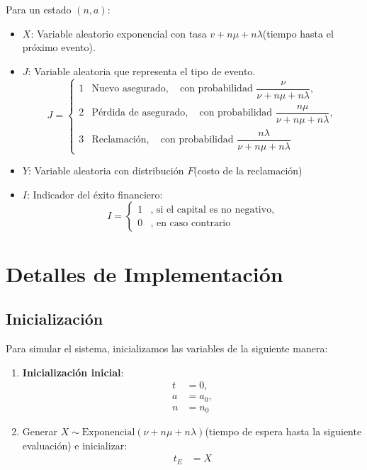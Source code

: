 \documentclass[12pt, a4paper]{article}
\begin{document}
Para un estado $(n,a)$:
\begin{itemize}
    \item $X$: Variable aleatorio exponencial con tasa $v+n\mu+n\lambda$(tiempo hasta el próximo evento).
    \item $J$: Variable aleatoria que representa el tipo de evento.
        \begin{equation}
            J = 
            \begin{cases}
                1 & \text{Nuevo asegurado}, \quad \text{con probabilidad } \dfrac{\nu}{\nu + n\mu + n\lambda}, \\
                2 & \text{Pérdida de asegurado}, \quad \text{con probabilidad } \dfrac{n\mu}{\nu + n\mu + n\lambda}, \\
                3 & \text{Reclamación}, \quad \text{con probabilidad } \dfrac{n\lambda}{\nu + n\mu + n\lambda}
            \end{cases}
        \end{equation}
    \item $Y$: Variable aleatoria con distribución $F$(costo de la reclamación)
    \item $I$: Indicador del éxito financiero:
        \begin{equation}
            I =
            \begin{cases}
                1 & \text{, si el capital es no negativo}, \\
                0 & \text{, en caso contrario}
            \end{cases}
        \end{equation}
\end{itemize}

\section{Detalles de Implementación} 

\subsection*{Inicialización}
Para simular el sistema, inicializamos las variables de la siguiente manera:

\begin{enumerate}
    \item \textbf{Inicialización inicial}:
    \begin{align*}
        t &= 0, \\
        a &= a_0, \\
        n &= n_0
    \end{align*}
    
    \item Generar $X \sim \text{Exponencial}(\nu + n\mu + n\lambda)$(tiempo de espera hasta la siguiente evaluación) e inicializar:
    \begin{align*}
        t_E &= X
    \end{align*}
\end{enumerate}
\end{document}
